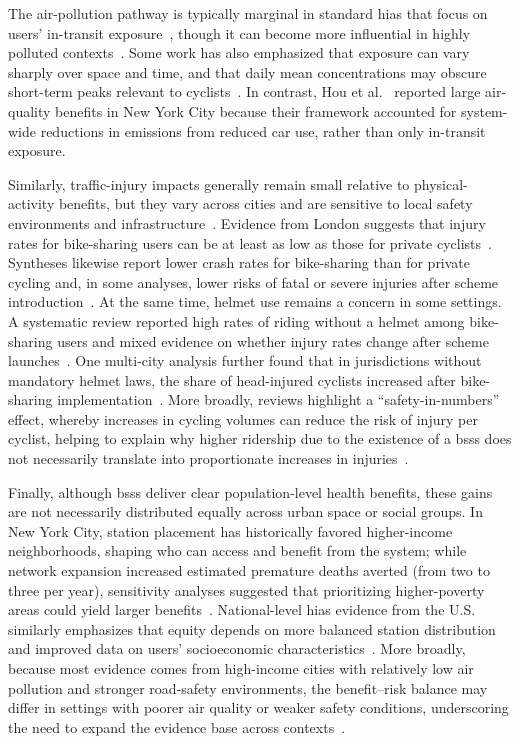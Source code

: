 The air-pollution pathway is typically marginal in standard \acp{hia} that focus on users' in-transit exposure~\cite{Rojas-Rueda2011, Woodcock2014, Otero2018, Clockston2021}, though it can become more influential in highly polluted contexts~\cite{Chen2023}. Some work has also emphasized that exposure can vary sharply over space and time, and that daily mean concentrations may obscure short-term peaks relevant to cyclists~\cite{Cao2021}. In contrast, Hou et al.~\cite{Hou2023} reported large air-quality benefits in New York City because their framework accounted for system-wide reductions in  emissions from reduced car use, rather than only in-transit exposure.

Similarly, traffic-injury impacts generally remain small relative to physical-activity benefits, but they vary across cities and are sensitive to local safety environments and infrastructure~\cite{Rojas-Rueda2011, Woodcock2014, Otero2018, Clockston2021}. Evidence from London suggests that injury rates for bike-sharing users can be at least as low as those for private cyclists~\cite{Woodcock2014}. Syntheses likewise report lower crash rates for bike-sharing than for private cycling and, in some analyses, lower risks of fatal or severe injuries after scheme introduction~\cite{Martin2016, Fishman2016_road_safety}. At the same time, helmet use remains a concern in some settings. A systematic review reported high rates of riding without a helmet among bike-sharing users and mixed evidence on whether injury rates change after scheme launches~\cite{Chen2021}. One multi-city analysis further found that in jurisdictions without mandatory helmet laws, the share of head-injured cyclists increased after bike-sharing implementation~\cite{Graves2014}. More broadly, reviews highlight a ``safety-in-numbers'' effect, whereby increases in cycling volumes can reduce the risk of injury per cyclist, helping to explain why higher ridership due to the existence of a \acp{bss} does not necessarily translate into proportionate increases in injuries~\cite{Jacobsen2015, Teixeira2021}.

Finally, although \acp{bss} deliver clear population-level health benefits, these gains are not necessarily distributed equally across urban space or social groups. In New York City, station placement has historically favored higher-income neighborhoods, shaping who can access and benefit from the system; while network expansion increased estimated premature deaths averted (from two to three per year), sensitivity analyses suggested that prioritizing higher-poverty areas could yield larger benefits~\cite{Babagoli2019}. National-level \acp{hia} evidence from the U.S. similarly emphasizes that equity depends on more balanced station distribution and improved data on users’ socioeconomic characteristics~\cite{Clockston2021}. More broadly, because most evidence comes from high-income cities with relatively low air pollution and stronger road-safety environments, the benefit--risk balance may differ in settings with poorer air quality or weaker safety conditions, underscoring the need to expand the evidence base across contexts~\cite{Teixeira2021, Tainio2016}.